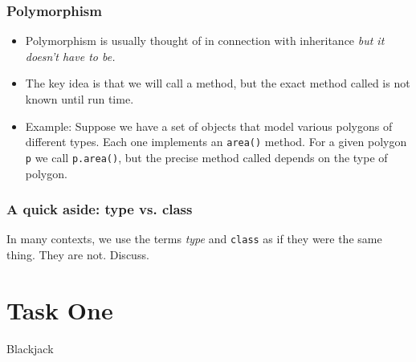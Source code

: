 \documentclass[10pt]{beamer}
\begin{document}
\begin{frame}
	\frametitle{Polymorphism}
	\begin{itemize}
		\item Polymorphism is usually thought of in connection with
			inheritance \emph{but it doesn't have to be.}
		\item The key idea is that we will call a method, but the 
			exact method called is not known until run time.
		\item Example:  Suppose we have a set of objects that model various 
			polygons of different types.  Each one implements an \texttt{area()}
			method. For a given polygon \texttt{p} we call \texttt{p.area()}, but
			the precise method called depends on the type of polygon.
	\end{itemize}
\end{frame}
\begin{frame}
	\frametitle{A quick aside: type vs. class}

	In many contexts, we use the terms \emph{type} and
	\texttt{class} as if they were the same thing. They
	are not.  Discuss.
\end{frame}

\section{Task One}
\begin{frame}

	Blackjack

\end{frame}
\end{document}
